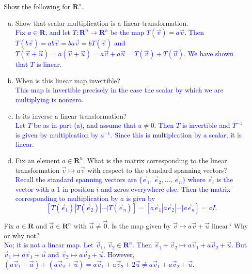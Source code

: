 \documentclass[a4paper,11pt]{article}
\newcommand{\R}{\mathbf{R}}
\newcommand{\BB}[1]{\textcolor{blue}{#1}}
\begin{document}
 Show the following for $\R^n$.
\begin{enumerate}[(a)]
\item Show that scalar multiplication is a linear transformation. \\

  \BB{Fix $a \in \R$, and let $T:\R^n \rightarrow \R^n$ be the map $T(\vec
    v)=a\vec v$. Then $T(b\vec v)=ab\vec v=ba\vec v=bT(\vec v)$ and $T(\vec
    v+\vec u)=a(\vec v+\vec u)=a\vec v+a\vec u=T(\vec v)+T(\vec u)$. We have
    shown that $T$ is linear. \\}

\item When is this linear map invertible? \\

  \BB{This map is invertible precisely in the case the scalar by which we are
    multiplying is nonzero. \\}
  
\item Is its inverse a linear transformation? \\

  \BB{Let $T$ be as in part (a), and assume that $a \neq 0$. Then $T$ is
    invertible and $T^{-1}$ is given by multiplcation by $a^{-1}$. Since this
    is multiplcation by a scalar, it is linear. \\}
  
\item Fix an element $a \in \R^n$. What is the matrix corresponding to the
linear transformation $\vec v \mapsto a\vec v$ with respect to the standard
spanning vectors? \\

\BB{Recall the standard spanning vectors are $\{\vec e_1,\,\vec e_2,\dots,\,\vec
  e_n\}$ where $\vec e_i$ is the vector with a 1 in position $i$ and zeros
  everywhere else. Then the matrix corresponding to multiplication by $a$ is
  givn by
  \[
    [T(\vec e_1) | T(\vec e_2) | \cdots | T(\vec e_n)]=
    [a\vec e_1 | a\vec e_2 | \cdots | a\vec e_n] = aI.
  \]
}
\end{enumerate}

 Fix $a \in \R$ and $\vec u \in \R^n$ with $\vec
u\neq\vec 0$. Is the map given by $\vec v \mapsto a\vec v + \vec u$ linear? Why
or why not? \\

\BB{No; it is not a linear map. Let $\vec v_1,\,\vec v_2 \in \R^n$. Then $\vec
  v_1+\vec v_2 \mapsto a\vec v_1+a\vec v_2+\vec u$. But $\vec v_1 \mapsto a\vec
  v_1+\vec u$ and $\vec v_2 \mapsto a\vec v_2+\vec u$. However, $(a\vec v_1+\vec
  u)+(a\vec v_2+\vec u)=a\vec v_1+a\vec v_2+2\vec u \neq a\vec v_1+a\vec
  v_2+\vec u$. \\}
\end{document}
